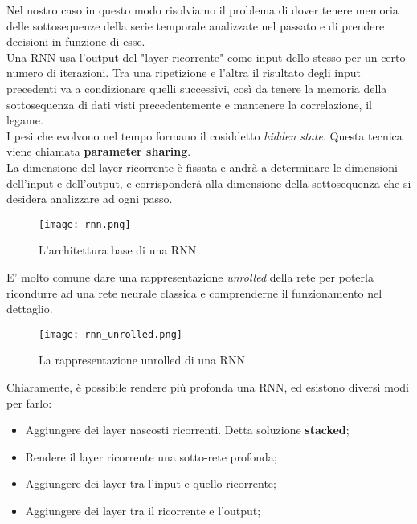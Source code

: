 Nel nostro caso in questo modo risolviamo il problema di dover tenere memoria delle sottosequenze della serie temporale analizzate nel passato e di prendere decisioni in funzione di esse.\\
Una RNN usa l'output del "layer ricorrente" come input dello stesso per un certo numero di iterazioni. Tra una ripetizione e l'altra il risultato degli input precedenti va a condizionare quelli successivi, così da tenere la memoria della sottosequenza di dati visti precedentemente e mantenere la correlazione, il legame.\\
I pesi che evolvono nel tempo formano il cosiddetto \textit{hidden state}. Questa tecnica viene chiamata \textbf{parameter sharing}.\\
La dimensione del layer ricorrente è fissata e andrà a determinare le dimensioni dell'input e dell'output, e corrisponderà alla dimensione della sottosequenza che si desidera analizzare ad ogni passo.
\begin{figure}[H]
	\centering
	\texttt{[image: rnn.png]}
	\caption{L'architettura base di una RNN}
	\label{fig:rnn}
\end{figure}
E' molto comune dare una rappresentazione \textit{unrolled} della rete per poterla ricondurre ad una rete neurale classica e comprenderne il funzionamento nel dettaglio.
\begin{figure}[H]
	\centering
	\texttt{[image: rnn\_unrolled.png]}
	\caption{La rappresentazione unrolled di una RNN}
	\label{fig:rnn_unrolled}
\end{figure}
Chiaramente, è possibile rendere più profonda una RNN, ed esistono diversi modi per farlo:
\begin{itemize}
	\item Aggiungere dei layer nascosti ricorrenti. Detta soluzione \textbf{stacked};
	\item Rendere il layer ricorrente una sotto-rete profonda;
	\item Aggiungere dei layer tra l'input e quello ricorrente;
	\item Aggiungere dei layer tra il ricorrente e l'output;
\end{itemize}

